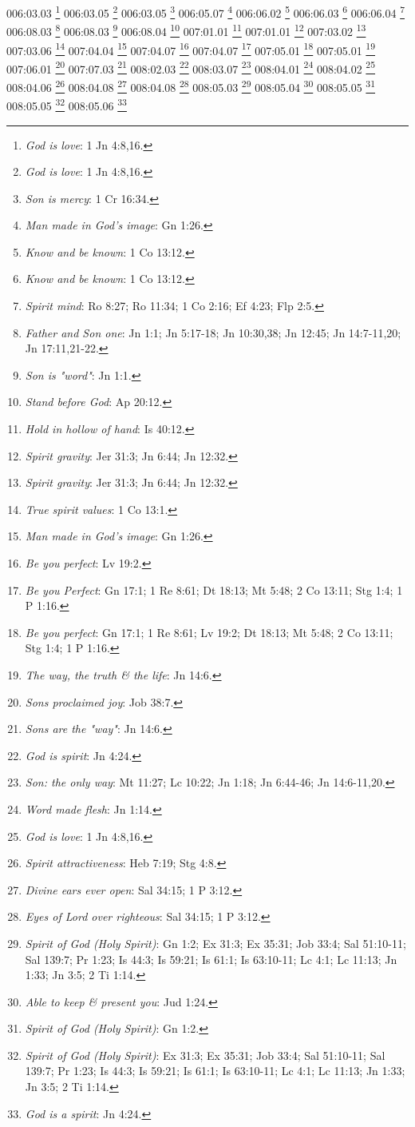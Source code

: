 {006:03.03 \footnote{\textit{God is love}: 1 Jn 4:8,16.}
006:03.05 \footnote{\textit{God is love}: 1 Jn 4:8,16.}
006:03.05 \footnote{\textit{Son is mercy}: 1 Cr 16:34.}
006:05.07 \footnote{\textit{Man made in God's image}: Gn 1:26.}
006:06.02 \footnote{\textit{Know and be known}: 1 Co 13:12.}
006:06.03 \footnote{\textit{Know and be known}: 1 Co 13:12.}
006:06.04 \footnote{\textit{Spirit mind}: Ro 8:27; Ro 11:34; 1 Co 2:16; Ef 4:23; Flp 2:5.}
006:08.03 \footnote{\textit{Father and Son one}: Jn 1:1; Jn 5:17-18; Jn 10:30,38; Jn 12:45; Jn 14:7-11,20; Jn 17:11,21-22.}
006:08.03 \footnote{\textit{Son is "word"}: Jn 1:1.}
006:08.04 \footnote{\textit{Stand before God}: Ap 20:12.}
007:01.01 \footnote{\textit{Hold in hollow of hand}: Is 40:12.}
007:01.01 \footnote{\textit{Spirit gravity}: Jer 31:3; Jn 6:44; Jn 12:32.}
007:03.02 \footnote{\textit{Spirit gravity}: Jer 31:3; Jn 6:44; Jn 12:32.}
007:03.06 \footnote{\textit{True spirit values}: 1 Co 13:1.}
007:04.04 \footnote{\textit{Man made in God's image}: Gn 1:26.}
007:04.07 \footnote{\textit{Be you perfect}: Lv 19:2.}
007:04.07 \footnote{\textit{Be you Perfect}: Gn 17:1; 1 Re 8:61; Dt 18:13; Mt 5:48; 2 Co 13:11; Stg 1:4; 1 P 1:16.}
007:05.01 \footnote{\textit{Be you perfect}: Gn 17:1; 1 Re 8:61; Lv 19:2; Dt 18:13; Mt 5:48; 2 Co 13:11; Stg 1:4; 1 P 1:16.}
007:05.01 \footnote{\textit{The way, the truth & the life}: Jn 14:6.}
007:06.01 \footnote{\textit{Sons proclaimed joy}: Job 38:7.}
007:07.03 \footnote{\textit{Sons are the "way"}: Jn 14:6.}
008:02.03 \footnote{\textit{God is spirit}: Jn 4:24.}
008:03.07 \footnote{\textit{Son: the only way}: Mt 11:27; Lc 10:22; Jn 1:18; Jn 6:44-46; Jn 14:6-11,20.}
008:04.01 \footnote{\textit{Word made flesh}: Jn 1:14.}
008:04.02 \footnote{\textit{God is love}: 1 Jn 4:8,16.}
008:04.06 \footnote{\textit{Spirit attractiveness}: Heb 7:19; Stg 4:8.}
008:04.08 \footnote{\textit{Divine ears ever open}: Sal 34:15; 1 P 3:12.}
008:04.08 \footnote{\textit{Eyes of Lord over righteous}: Sal 34:15; 1 P 3:12.}
008:05.03 \footnote{\textit{Spirit of God (Holy Spirit)}: Gn 1:2; Ex 31:3; Ex 35:31; Job 33:4; Sal 51:10-11; Sal 139:7; Pr 1:23; Is 44:3; Is 59:21; Is 61:1; Is 63:10-11; Lc 4:1; Lc 11:13; Jn 1:33; Jn 3:5; 2 Ti 1:14.}
008:05.04 \footnote{\textit{Able to keep & present you}: Jud 1:24.}
008:05.05 \footnote{\textit{Spirit of God (Holy Spirit)}: Gn 1:2.}
008:05.05 \footnote{\textit{Spirit of God (Holy Spirit)}: Ex 31:3; Ex 35:31; Job 33:4; Sal 51:10-11; Sal 139:7; Pr 1:23; Is 44:3; Is 59:21; Is 61:1; Is 63:10-11; Lc 4:1; Lc 11:13; Jn 1:33; Jn 3:5; 2 Ti 1:14.}
008:05.06 \footnote{\textit{God is a spirit}: Jn 4:24.}
}
